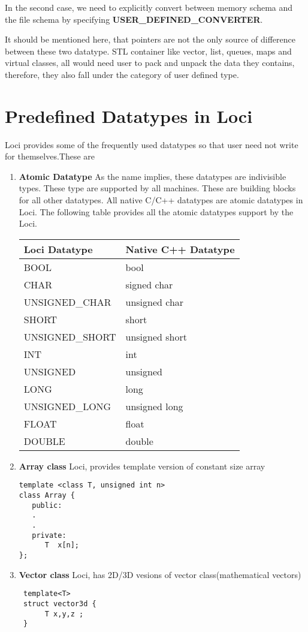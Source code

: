 In the second case, we need to explicitly convert between memory
schema and the file schema by specifying {\bf USER\_DEFINED\_CONVERTER}.
%
%
\par It should be mentioned here, that pointers are not the only source of 
difference between these two datatype. STL container like vector, list, queues,
maps and virtual classes, all would need user to pack and unpack the data they
contains, therefore, they also fall under the category of user defined type.
%
%
\section {Predefined Datatypes in Loci}
Loci provides some of the frequently used datatypes so that user need
not write for themselves.These are
%
%
\begin{enumerate}
\item {\bf Atomic Datatype}
As the name implies, these datatypes are indivisible types. These type
are supported by all machines. These are building blocks for all other
datatypes. All native C/C++ datatypes are atomic datatypes
in Loci. The following table provides all the atomic datatypes support
by the Loci.
%
\begin{center}
\begin{tabular} [h] {|l|l|} \hline
Loci Datatype & Native C++ Datatype \\ \hline \hline
BOOL & bool \\ \hline
CHAR & signed char \\\hline
UNSIGNED\_CHAR & unsigned char \\\hline
SHORT & short \\\hline
UNSIGNED\_SHORT & unsigned short \\\hline
INT & int \\\hline
UNSIGNED & unsigned \\\hline
LONG & long \\\hline
UNSIGNED\_LONG & unsigned long \\\hline
FLOAT & float \\\hline
DOUBLE & double \\\hline
\end{tabular}
\end{center}
\item {\bf Array class}
Loci, provides template version of constant size array
\begin{verbatim}
template <class T, unsigned int n>
class Array {
   public:
   .
   .
   private:
      T  x[n];
};
\end{verbatim}
\item {\bf Vector class}
Loci, has 2D/3D vesions of vector class(mathematical vectors)
\begin{verbatim}
 template<T>
 struct vector3d {
      T x,y,z ;
 }


\end{verbatim}
\end{enumerate}
